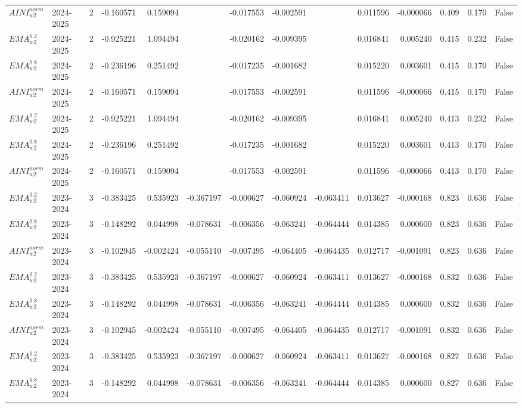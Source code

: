 \begin{tabular}{@{}llrrrrrrrrrlll@{}}
$AINI^{norm}_{w2}$ & 2024-2025 & 2 & -0.160571 & 0.159094 &  & -0.017553 & -0.002591 &  & 0.011596 & -0.000066 & 0.409 & 0.170 & False \\
$EMA^{0.2}_{w2}$ & 2024-2025 & 2 & -0.925221 & 1.094494 &  & -0.020162 & -0.009395 &  & 0.016841 & 0.005240 & 0.415 & 0.232 & False \\
$EMA^{0.8}_{w2}$ & 2024-2025 & 2 & -0.236196 & 0.251492 &  & -0.017235 & -0.001682 &  & 0.015220 & 0.003601 & 0.415 & 0.170 & False \\
$AINI^{norm}_{w2}$ & 2024-2025 & 2 & -0.160571 & 0.159094 &  & -0.017553 & -0.002591 &  & 0.011596 & -0.000066 & 0.415 & 0.170 & False \\
$EMA^{0.2}_{w2}$ & 2024-2025 & 2 & -0.925221 & 1.094494 &  & -0.020162 & -0.009395 &  & 0.016841 & 0.005240 & 0.413 & 0.232 & False \\
$EMA^{0.8}_{w2}$ & 2024-2025 & 2 & -0.236196 & 0.251492 &  & -0.017235 & -0.001682 &  & 0.015220 & 0.003601 & 0.413 & 0.170 & False \\
$AINI^{norm}_{w2}$ & 2024-2025 & 2 & -0.160571 & 0.159094 &  & -0.017553 & -0.002591 &  & 0.011596 & -0.000066 & 0.413 & 0.170 & False \\
$EMA^{0.2}_{w2}$ & 2023-2024 & 3 & -0.383425 & 0.535923 & -0.367197 & -0.000627 & -0.060924 & -0.063411 & 0.013627 & -0.000168 & 0.823 & 0.636 & False \\
$EMA^{0.8}_{w2}$ & 2023-2024 & 3 & -0.148292 & 0.044998 & -0.078631 & -0.006356 & -0.063241 & -0.064444 & 0.014385 & 0.000600 & 0.823 & 0.636 & False \\
$AINI^{norm}_{w2}$ & 2023-2024 & 3 & -0.102945 & -0.002424 & -0.055110 & -0.007495 & -0.064405 & -0.064435 & 0.012717 & -0.001091 & 0.823 & 0.636 & False \\
$EMA^{0.2}_{w2}$ & 2023-2024 & 3 & -0.383425 & 0.535923 & -0.367197 & -0.000627 & -0.060924 & -0.063411 & 0.013627 & -0.000168 & 0.832 & 0.636 & False \\
$EMA^{0.8}_{w2}$ & 2023-2024 & 3 & -0.148292 & 0.044998 & -0.078631 & -0.006356 & -0.063241 & -0.064444 & 0.014385 & 0.000600 & 0.832 & 0.636 & False \\
$AINI^{norm}_{w2}$ & 2023-2024 & 3 & -0.102945 & -0.002424 & -0.055110 & -0.007495 & -0.064405 & -0.064435 & 0.012717 & -0.001091 & 0.832 & 0.636 & False \\
$EMA^{0.2}_{w2}$ & 2023-2024 & 3 & -0.383425 & 0.535923 & -0.367197 & -0.000627 & -0.060924 & -0.063411 & 0.013627 & -0.000168 & 0.827 & 0.636 & False \\
$EMA^{0.8}_{w2}$ & 2023-2024 & 3 & -0.148292 & 0.044998 & -0.078631 & -0.006356 & -0.063241 & -0.064444 & 0.014385 & 0.000600 & 0.827 & 0.636 & False \\

\end{tabular}
